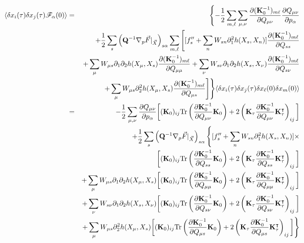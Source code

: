 \begin{eqnarray}
\langle \delta x_i(\tau) \delta x_j(\tau){\mathscr F}_\alpha(0)\rangle&=&  \Biggl\{- \frac{1}{2} \sum_{m,\ell} \sum_{\mu,\nu} \frac{\partial ({\bf K}_0^{-1})_{m\ell}} {\partial Q_{\mu\nu}}\frac {\partial Q_{\mu\nu}}{\partial p_\alpha}\\
& &+\frac{1}{2}  \sum_s \left({\bf Q}^{-1} \nabla_p{\vec { F}} |_{\vec X}\right)_{s\alpha} \sum_{m,\ell} \Bigg[ [f_s''+\sum_n W_{sn}  \partial^2_1 h(X_s,X_n)] \frac{\partial ({\bf K}_0^{-1})_{m\ell}} {\partial Q_{ss}}\nonumber\\
 & & + \sum_\mu W_{\mu s} \partial_1\partial_2h(X_\mu,X_s)\frac{\partial ({\bf K}_0^{-1})_{m\ell}} {\partial Q_{\mu\mu}}+ \sum_\nu W_{s\nu}\partial_1\partial_2h(X_s,X_\nu)\frac{\partial ({\bf K}_0^{-1})_{m\ell}}{\partial Q_{s\nu}}  \nonumber \\
 & &+ \sum_\mu W_{\mu s}\partial^2_2h(X_\mu,X_s) \frac{\partial ({\bf K}_0^{-1})_{m\ell}}{\partial Q_{\mu s}} \Bigg]
\Biggr\} \langle \delta x_i(\tau) \delta x_j(\tau)    \delta x_\ell(0) \delta x_m(0) \rangle \nonumber\\
  &=&- \frac{1}{2}  \sum_{\mu,\nu}\frac {\partial Q_{\mu\nu}}{\partial p_\alpha}\biggl[ ({\bf K}_0)_{ij}\text{Tr}\left(\frac{\partial {\bf K}_0^{-1}}{\partial Q_{\mu \nu}} {\bf K}_0\right)+2 \left({\bf K}_\tau\frac{\partial {\bf K}_0^{-1}}{\partial Q_{\mu \nu}} {\bf K}_\tau^\intercal\right)_{ij}\bigg]\nonumber\\
  &&+\frac{1}{2}  \sum_s \left({\bf Q}^{-1} \nabla_p{\vec { F}} |_{\vec X}\right)_{s\alpha}  \Biggl\{ [ f_s''+  \sum_n W_{sn}\partial_1^2h(X_s,X_n)] \times\nonumber\\
    & &\biggl[ ({\bf K}_0)_{ij}\text{Tr}\left(\frac{\partial {\bf K}_0^{-1}}{\partial Q_{ss}} {\bf K}_0\right)+2 \left({\bf K}_\tau\frac{\partial {\bf K}_0^{-1}}{\partial Q_{ss}} {\bf K}_\tau^\intercal\right)_{ij}\bigg] \label{dxdxtauscrF}\\
   & & +\sum_\mu W_{\mu s}\partial_1\partial_2h(X_\mu,X_s) \biggl[ ({\bf K}_0)_{ij}\text{Tr}\left(\frac{\partial {\bf K}_0^{-1}}{\partial Q_{\mu\mu}} {\bf K}_0\right)+2 \left({\bf K}_\tau\frac{\partial {\bf K}_0^{-1}}{\partial Q_{\mu\mu}} {\bf K}_\tau^\intercal\right)_{ij}\bigg] \nonumber\\
   & & +  \sum_\nu W_{s\nu} \partial_1\partial_2h(X_s,X_\nu)  \biggl[ ({\bf K}_0)_{ij}\text{Tr}\left(\frac{\partial {\bf K}_0^{-1}}{\partial Q_{s\nu}} {\bf K}_0\right)+2 \left({\bf K}_\tau\frac{\partial {\bf K}_0^{-1}}{\partial Q_{s\nu}} {\bf K}_\tau^\intercal\right)_{ij}\bigg]    \nonumber\\
   & & +\sum_\mu W_{\mu s}  \partial_2^2h(X_\mu,X_s)\biggl[ ({\bf K}_0)_{ij}\text{Tr}\left(\frac{\partial {\bf K}_0^{-1}}{\partial Q_{\mu s}} {\bf K}_0\right)+2 \left({\bf K}_\tau\frac{\partial {\bf K}_0^{-1}}{\partial Q_{\mu s}} {\bf K}_\tau^\intercal\right)_{ij}\bigg]
   \Biggr\} \nonumber
\end{eqnarray}
